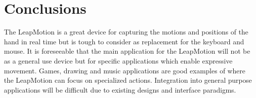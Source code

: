 \section{Conclusions}
The LeapMotion is a great device for capturing the motions and positions of the hand in real time but is tough to consider as replacement for the keyboard and mouse. It is foreseeable that the main application for the LeapMotion will not be as a general use device but for specific applications which enable expressive movement. Games, drawing and music applications are good examples of where the LeapMotion can focus on specialized actions. Integration into general purpose applications will be difficult due to existing designs and interface paradigms. 








